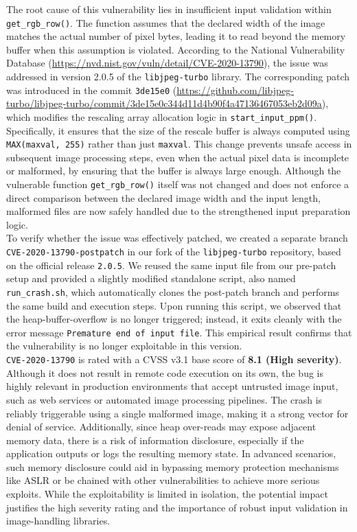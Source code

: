 \documentclass[12pt]{article}
\begin{document}
\noindent The root cause of this vulnerability lies in insufficient input validation within \texttt{get\_rgb\_row()}. The function assumes that the declared width of the image matches the actual number of pixel bytes, leading it to read beyond the memory buffer when this assumption is violated. According to the National Vulnerability Database (\url{https://nvd.nist.gov/vuln/detail/CVE-2020-13790}), the issue was addressed in version 2.0.5 of the \texttt{libjpeg-turbo} library. The corresponding patch was introduced in the commit \texttt{3de15e0} (\url{https://github.com/libjpeg-turbo/libjpeg-turbo/commit/3de15e0c344d11d4b90f4a47136467053eb2d09a}), which modifies the rescaling array allocation logic in \texttt{start\_input\_ppm()}. Specifically, it ensures that the size of the rescale buffer is always computed using \texttt{MAX(maxval, 255)} rather than just \texttt{maxval}. This change prevents unsafe access in subsequent image processing steps, even when the actual pixel data is incomplete or malformed, by ensuring that the buffer is always large enough. Although the vulnerable function \texttt{get\_rgb\_row()} itself was not changed and does not enforce a direct comparison between the declared image width and the input length, malformed files are now safely handled due to the strengthened input preparation logic.\\

\noindent To verify whether the issue was effectively patched, we created a separate branch \texttt{CVE-2020-13790-postpatch} in our fork of the \texttt{libjpeg-turbo} repository, based on the official release \texttt{2.0.5}. We reused the same input file from our pre-patch setup and provided a slightly modified standalone script, also named \texttt{run\_crash.sh}, which automatically clones the post-patch branch and performs the same build and execution steps. Upon running this script, we observed that the heap-buffer-overflow is no longer triggered; instead, it exits cleanly with the error message \texttt{Premature end of input file}. This empirical result confirms that the vulnerability is no longer exploitable in this version.\\

\noindent \texttt{CVE-2020-13790} is rated with a CVSS v3.1 base score of \textbf{8.1 (High severity)}. Although it does not result in remote code execution on its own, the bug is highly relevant in production environments that accept untrusted image input, such as web services or automated image processing pipelines. The crash is reliably triggerable using a single malformed image, making it a strong vector for denial of service. Additionally, since heap over-reads may expose adjacent memory data, there is a risk of information disclosure, especially if the application outputs or logs the resulting memory state. In advanced scenarios, such memory disclosure could aid in bypassing memory protection mechanisms like ASLR or be chained with other vulnerabilities to achieve more serious exploits. While the exploitability is limited in isolation, the potential impact justifies the high severity rating and the importance of robust input validation in image-handling libraries.
\end{document}
